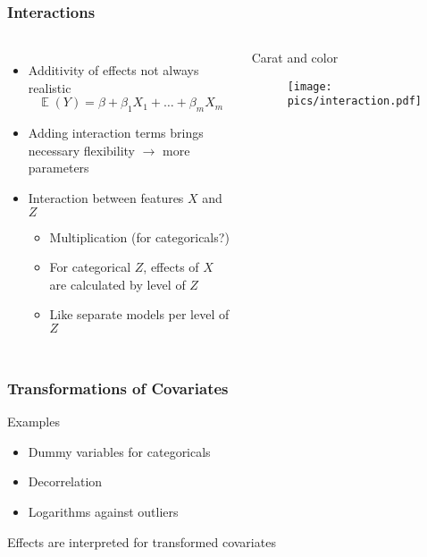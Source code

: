 \documentclass[
    utf8,
    aspectratio=169
]{beamer}  %
\DeclareMathOperator{\E}{\mathbb{E}}  %
\begin{document}
\begin{frame}
	\frametitle{Interactions}
	\begin{columns}
		\begin{itemize}
			\item Additivity of effects not always realistic
			$$
				\E(Y) = \beta + \beta_1 X_1 + \dots + \beta_m X_m
			$$
			\item Adding interaction terms brings necessary flexibility 
			$\rightarrow$ more parameters
			\item Interaction between features $X$ and $Z$
			\begin{itemize}
				\item Multiplication (for categoricals?)
				\item For categorical $Z$, effects of $X$ are calculated by level of $Z$
				\item Like separate models per level of $Z$
			\end{itemize}
		\end{itemize}
		
		\begin{block}{\centering Carat and color}
			\begin{figure}
				\texttt{[image: pics/interaction.pdf]}
			\end{figure}
		\end{block}
	\end{columns}
\end{frame}

\begin{frame}
	\frametitle{Transformations of Covariates}
	\begin{block}{Examples}
		\begin{itemize}
			\item Dummy variables for categoricals
			\item Decorrelation
			\item Logarithms against outliers
		\end{itemize}
	\end{block}
	
	\vfill
	
	Effects are interpreted for transformed covariates
\end{frame}
\end{document}
